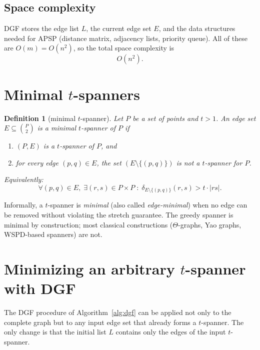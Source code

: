 \documentclass{article}
\newtheorem{definition}[theorem]{Definition}
\begin{document}
\subsection{Space complexity}
DGF stores the edge list $L$, the current edge set $E$, and the
data structures needed for APSP (distance matrix, adjacency lists,
priority queue). All of these are $O(m)=O(n^2)$, so the total space
complexity is
\[
   O(n^2).
\]

\newpage

\section{Minimal \texorpdfstring{$t$}{t}-spanners}
\label{sec:minimal-def}

\begin{definition}[minimal $t$-spanner]\label{def:minimal}
Let $P$ be a set of points and $t>1$. An edge set $E\subseteq \binom{P}{2}$
is a \emph{minimal $t$-spanner} of $P$ if
\begin{enumerate}
    \item $(P,E)$ is a $t$-spanner of $P$, and
    \item for every edge $(p,q)\in E$, the set $(E \setminus \{(p,q)\})$ is not a $t$-spanner for $P$. 
\end{enumerate}
Equivalently:
\[
   \forall (p,q)\in E,\; \exists (r,s)\in P\times P\;:\;
   \delta_{E\setminus\{(p,q)\}}(r,s) > t\cdot|rs|.
\]
\end{definition}

Informally, a $t$-spanner is \emph{minimal} (also called \emph{edge-minimal})
when no edge can be removed without violating the stretch guarantee. The
greedy spanner is minimal by construction; most classical constructions
($\Theta$-graphs, Yao graphs, WSPD-based spanners) are not.

\section{Minimizing an arbitrary \texorpdfstring{$t$}{t}-spanner with DGF}
\label{sec:filtering}

The DGF procedure of Algorithm~\ref{alg:dgf} can be applied not only to
the complete graph but to any input edge set that already forms a
$t$-spanner. The only change is that the initial list $L$ contains
only the edges of the input $t$-spanner.
\end{document}
